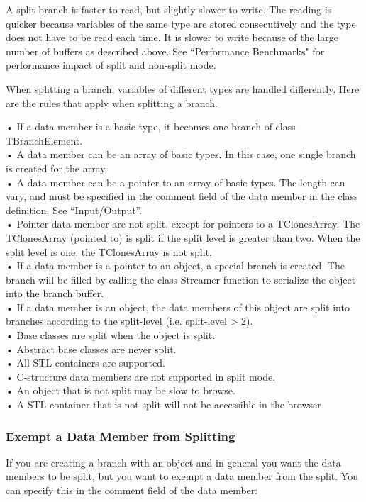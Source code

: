 \documentclass[12pt,a4paper]{article}
\begin{document}
A split branch is faster to read, but slightly slower to write. The reading is quicker because variables of the same type
are stored consecutively and the type does not have to be read each time. It is slower to write because of the large
number of buffers as described above. See ``Performance Benchmarks" for performance impact of split and non-split mode.

When splitting a branch, variables of different types are handled differently. Here are the rules that apply when splitting
a branch. 

• If a data member is a basic type, it becomes one branch of class TBranchElement. \\
• A data member can be an array of basic types. In this case, one single branch is created for the array. \\
• A data member can be a pointer to an array of basic types. The length can vary, and must be specified in the comment field of the data member in the class definition. See “Input/Output”. \\
• Pointer data member are not split, except for pointers to a TClonesArray. The TClonesArray (pointed to) is split if the split level is greater than two. When the split level is one, the TClonesArray is not split. \\
• If a data member is a pointer to an object, a special branch is created. The branch will be filled by calling the class Streamer function to serialize the object into the branch buffer. \\
• If a data member is an object, the data members of this object are split into branches according to the split-level (i.e. split-level > 2). \\
• Base classes are split when the object is split. \\
• Abstract base classes are never split. \\
• All STL containers are supported. \\
• C-structure data members are not supported in split mode. \\
• An object that is not split may be slow to browse. \\
• A STL container that is not split will not be accessible in the browser

\subsubsection{Exempt a Data Member from Splitting}
If you are creating a branch with an object and in general you want the data members to be split, but you want to
exempt a data member from the split. You can specify this in the comment field of the data member:
\end{document}
